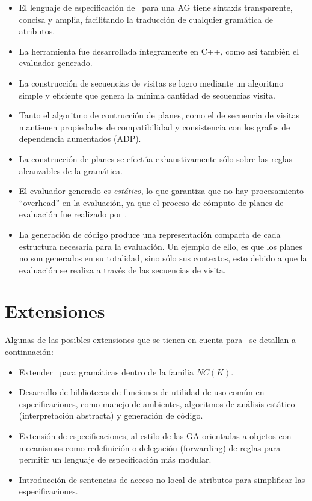 \begin{itemize}
\item El lenguaje de especificación de \maggen\ para una AG tiene sintaxis transparente, concisa y amplia, facilitando la traducción de cualquier gramática de atributos.

\item La herramienta fue desarrollada íntegramente en C++, como así también el evaluador generado. 

\item La construcción de secuencias de visitas se logro mediante un algoritmo simple y eficiente que genera la mínima cantidad de secuencias visita.

\item Tanto el algoritmo de contrucción de planes, como el de secuencia de visitas mantienen propiedades de compatibilidad y consistencia con los grafos de dependencia aumentados (ADP).

\item La construcción de planes se efectúa exhaustivamente sólo sobre las reglas alcanzables de la gramática.


 \item El evaluador generado es \textit{estático}, lo que garantiza que no hay procesamiento ``overhead'' en la evaluación, ya que el proceso de cómputo de planes de evaluación fue realizado por \maggen.
 
 \item La generación de código produce una representación compacta de cada estructura necesaria para la evaluación. Un ejemplo de ello, es que los planes no son generados en su totalidad, sino sólo sus contextos, esto debido a que la evaluación se realiza a través de las secuencias de visita.

\end{itemize}

\section{Extensiones}
Algunas de las posibles extensiones que se tienen en cuenta para \maggen\ se detallan a continuación:
\begin{itemize}
\item Extender \maggen\ para gramáticas dentro de la familia $NC(K)$.

\item Desarrollo de bibliotecas de funciones de utilidad de uso común en especificaciones, 
como manejo de ambientes, algoritmos de análisis estático (interpretación abstracta) y
generación de código.
\item Extensión de especificaciones, al estilo de las GA orientadas a objetos con mecanismos como redefinición o delegación (forwarding) de reglas para permitir un lenguaje de especificación más modular.
\item Introducción de sentencias de acceso no local de atributos para simplificar las
especificaciones.

\end{itemize}

